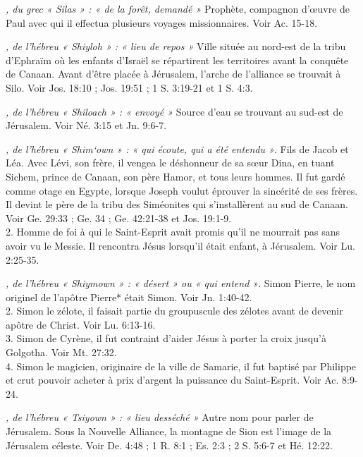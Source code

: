 \begin{multicols}{2}
\textit{, du grec « Silas » : « de la forêt, demandé »}\newline
Prophète, compagnon d'œuvre de Paul avec qui il effectua plusieurs voyages missionnaires. Voir Ac. 15-18.

\textit{, de l'hébreu « Shiyloh » : « lieu de repos »}\newline
Ville située au nord-est de la tribu d'Ephraïm où les enfants d'Israël se répartirent les territoires avant la conquête de Canaan. Avant d'être placée à Jérusalem, l'arche de l'alliance se trouvait à Silo. Voir Jos. 18:10 ; Jos. 19:51 ; 1 S. 3:19-21 et 1 S. 4:3.

\textit{, de l'hébreu « Shiloach » : « envoyé »}\newline
Source d'eau se trouvant au sud-est de Jérusalem. Voir Né. 3:15 et Jn. 9:6-7.

\textit{, de l'hébreu « Shim`own » : « qui écoute, qui a été entendu »}. Fils de Jacob et Léa. Avec Lévi, son frère, il vengea le déshonneur de sa sœur Dina, en tuant Sichem, prince de Canaan, son père Hamor, et tous leurs hommes. Il fut gardé comme otage en Egypte, lorsque Joseph voulut éprouver la sincérité de ses frères. Il devint le père de la tribu des Siméonites qui s'installèrent au sud de Canaan. Voir Ge. 29:33 ; Ge. 34 ; Ge. 42:21-38 et Jos. 19:1-9.
\\2. Homme de foi à qui le Saint-Esprit avait promis qu'il ne mourrait pas sans avoir vu le Messie. Il rencontra Jésus lorsqu'il était enfant, à Jérusalem. Voir Lu. 2:25-35.

\textit{, de l'hébreu « Shiymown » : « désert » ou « qui entend »}. Simon Pierre, le nom originel de l'apôtre Pierre* était Simon. Voir Jn. 1:40-42.
\\2. Simon le zélote, il faisait partie du groupuscule des zélotes avant de devenir apôtre de Christ. Voir Lu. 6:13-16.
\\3. Simon de Cyrène, il fut contraint d'aider Jésus à porter la croix jusqu'à Golgotha. Voir Mt. 27:32.
\\4. Simon le magicien, originaire de la ville de Samarie, il fut baptisé par Philippe et crut pouvoir acheter à prix d'argent la puissance du Saint-Esprit. Voir Ac. 8:9-24.

\textit{, de l'hébreu « Tsiyown » : « lieu desséché »}\newline
Autre nom pour parler de Jérusalem. Sous la Nouvelle Alliance, la montagne de Sion est l'image de la Jérusalem céleste. Voir De. 4:48 ; 1 R. 8:1 ; Es. 2:3 ; 2 S. 5:6-7 et Hé. 12:22.


\end{multicols}

